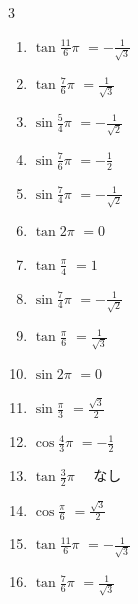 \begin{multicols}{3}
\begin{enumerate}
  \item $\displaystyle \tan{\frac{11}{6}\pi}$
        $\displaystyle =-\frac{1}{\sqrt{3}}$

  \item $\displaystyle \tan{\frac{7}{6}\pi}$
        $\displaystyle =\frac{1}{\sqrt{3}}$

  \item $\displaystyle \sin{\frac{5}{4}\pi}$
        $\displaystyle =-\frac{1}{\sqrt{2}}$

  \item $\displaystyle \sin{\frac{7}{6}\pi}$
        $\displaystyle =-\frac{1}{2}$

  \item $\displaystyle \sin{\frac{7}{4}\pi}$
        $\displaystyle =-\frac{1}{\sqrt{2}}$

  \item $\displaystyle \tan{2\pi}$
        $\displaystyle =0$

  \item $\displaystyle \tan{\frac{\pi}{4}}$
        $\displaystyle =1$

  \item $\displaystyle \sin{\frac{7}{4}\pi}$
        $\displaystyle =-\frac{1}{\sqrt{2}}$

  \item $\displaystyle \tan{\frac{\pi}{6}}$
        $\displaystyle =\frac{1}{\sqrt{3}}$

\columnbreak %

  \item $\displaystyle \sin{2\pi}$
        $\displaystyle =0$

  \item $\displaystyle \sin{\frac{\pi}{3}}$
        $\displaystyle =\frac{\sqrt{3}}{2}$

  \item $\displaystyle \cos{\frac{4}{3}\pi}$
        $\displaystyle =-\frac{1}{2}$

  \item $\displaystyle \tan{\frac{3}{2}\pi}$
        $\displaystyle \quad なし$

  \item $\displaystyle \cos{\frac{\pi}{6}}$
        $\displaystyle =\frac{\sqrt{3}}{2}$

  \item $\displaystyle \tan{\frac{11}{6}\pi}$
        $\displaystyle =-\frac{1}{\sqrt{3}}$

  \item $\displaystyle \tan{\frac{7}{6}\pi}$
        $\displaystyle =\frac{1}{\sqrt{3}}$


\end{enumerate}
\end{multicols}
